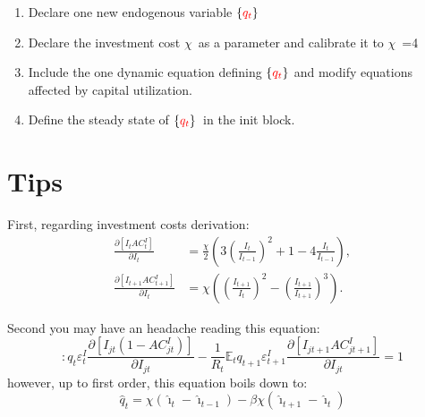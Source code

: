 \documentclass{article}%
\begin{document}
\begin{enumerate}
\item Declare one new endogenous variable $\{\textcolor{red}{q_{t}}\}$

\item Declare the investment cost $\chi$\ as a parameter and calibrate it to
$\chi$\ =4

\item Include the one dynamic equation defining $\{\textcolor{red}{q_{t}}\}$
and modify equations affected by capital utilization.

\item Define the steady state of $\{\textcolor{red}{q_{t}}\}$\ in the init block.
\end{enumerate}

\section{Tips}

First, regarding investment costs derivation:%
\begin{align*}
\frac{\partial\left[  I_{t}AC_{t}^{I}\right]  }{\partial I_{t}}  &
=\frac{\chi}{2}\left(  3\left(  \frac{I_{t}}{I_{t-1}}\right)  ^{2}%
+1-4\frac{I_{t}}{I_{t-1}}\right)  ,\\
\frac{\partial\left[  I_{t+1}AC_{t+1}^{I}\right]  }{\partial I_{t}}  &
=\chi\left(  \left(  \frac{I_{t+1}}{I_{t}}\right)  ^{2}-\left(  \frac{I_{t+1}%
}{I_{t+1}}\right)  ^{3}\right)  .
\end{align*}


Second you may have an headache reading this equation:
\[
:q_{t}\varepsilon_{t}^{I}\frac{\partial\left[  I_{jt}\left(  1-AC_{jt}%
^{I}\right)  \right]  }{\partial I_{jt}}-\frac{1}{R_{t}}\mathbb{E}_{t}%
q_{t+1}\varepsilon_{t+1}^{I}\frac{\partial\left[  I_{jt+1}AC_{jt+1}%
^{I}\right]  }{\partial I_{jt}}=1
\]
however, up to first order, this equation boils down to:%
\[
\hat{q}_{t}=\chi(\hat{\imath}_{t}-\hat{\imath}_{t-1})-\beta\chi(\hat{\imath
}_{t+1}-\hat{\imath}_{t})
\]
\end{document}
